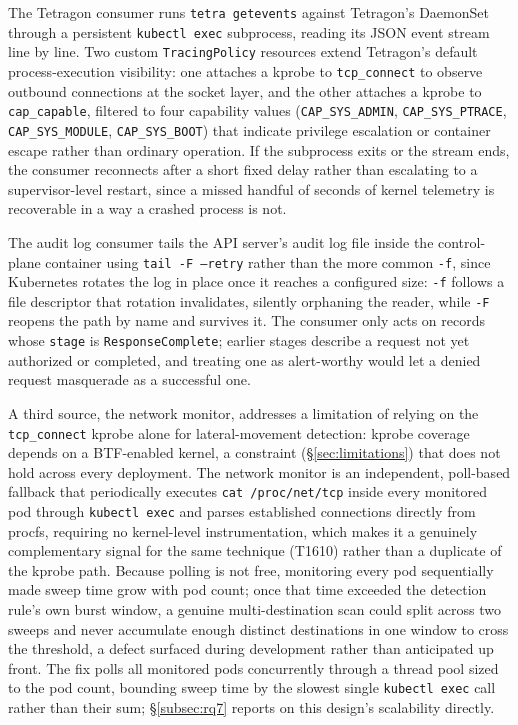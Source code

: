 \documentclass{ieeeaccess}
\begin{document}
The Tetragon consumer runs \texttt{tetra getevents} against Tetragon's DaemonSet
through a persistent \texttt{kubectl exec} subprocess, reading its JSON event
stream line by line. Two custom \texttt{TracingPolicy} resources extend
Tetragon's default process-execution visibility: one attaches a kprobe
to \texttt{tcp\_connect} to observe outbound connections at the socket layer,
and the other attaches a kprobe to \texttt{cap\_capable}, filtered to four
capability values (\texttt{CAP\_SYS\_ADMIN}, \texttt{CAP\_SYS\_PTRACE}, \texttt{CAP\_SYS\_MODULE},
\texttt{CAP\_SYS\_BOOT}) that indicate privilege escalation or container escape
rather than ordinary operation. If the subprocess exits or the stream
ends, the consumer reconnects after a short fixed delay rather than
escalating to a supervisor-level restart, since a missed handful of
seconds of kernel telemetry is recoverable in a way a crashed process
is not.

The audit log consumer tails the API server's audit log file inside
the control-plane container using \texttt{tail -F --retry} rather than the more
common \texttt{-f}, since Kubernetes rotates the log in place once it reaches
a configured size: \texttt{-f} follows a file descriptor that rotation
invalidates, silently orphaning the reader, while \texttt{-F} reopens the path
by name and survives it. The consumer only acts on records whose
\texttt{stage} is \texttt{ResponseComplete}; earlier stages describe a request not yet
authorized or completed, and treating one as alert-worthy would let a
denied request masquerade as a successful one.

A third source, the network monitor, addresses a limitation of relying
on the \texttt{tcp\_connect} kprobe alone for lateral-movement detection: kprobe
coverage depends on a BTF-enabled kernel, a constraint
(\S\ref{sec:limitations}) that does not hold across every deployment.
The network monitor is an independent, poll-based fallback that
periodically executes \texttt{cat /proc/net/tcp} inside every monitored pod
through \texttt{kubectl exec} and parses established connections directly from
procfs, requiring no kernel-level instrumentation, which makes it a
genuinely complementary signal for the same technique (T1610) rather
than a duplicate of the kprobe path. Because polling is not free,
monitoring every pod sequentially made sweep time grow with pod count;
once that time exceeded the detection rule's own burst window, a
genuine multi-destination scan could split across two sweeps and never
accumulate enough distinct destinations in one window to cross the
threshold, a defect surfaced during development rather than
anticipated up front. The fix polls all monitored pods concurrently
through a thread pool sized to the pod count, bounding sweep time by
the slowest single \texttt{kubectl exec} call rather than their sum;
\S\ref{subsec:rq7} reports on this design's scalability directly.
\end{document}
